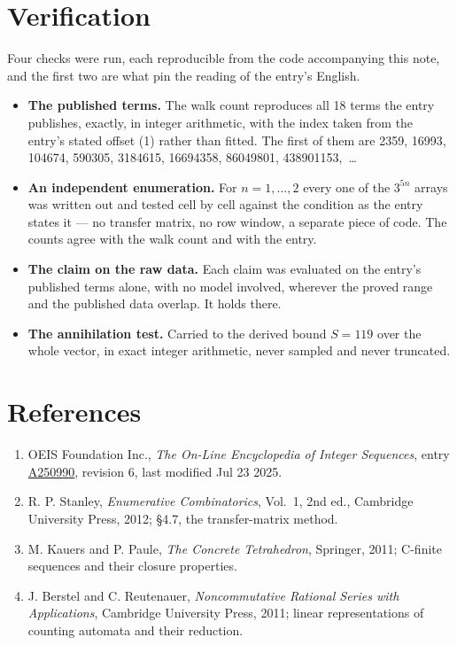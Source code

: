 \documentclass[11pt]{article}
\theoremstyle{definition}
\begin{document}
\section{Verification}

Four checks were run, each reproducible from the code accompanying this note, and the first two are what pin the reading of the entry's English.

\begin{itemize}

\item {\bfseries The published terms.} The walk count reproduces all 18 terms the entry publishes, exactly, in integer arithmetic, with the index taken from the entry's stated offset (1) rather than fitted. The first of them are 2359, 16993, 104674, 590305, 3184615, 16694358, 86049801, 438901153,~\dots

\item {\bfseries An independent enumeration.} For $n = 1,\dots,2$ every one of the $3^{5n}$ arrays was written out and tested cell by cell against the condition as the entry states it --- no transfer matrix, no row window, a separate piece of code. The counts agree with the walk count and with the entry.

\item {\bfseries The claim on the raw data.} Each claim was evaluated on the entry's published terms alone, with no model involved, wherever the proved range and the published data overlap. It holds there.

\item {\bfseries The annihilation test.} Carried to the derived bound $S = 119$ over the whole vector, in exact integer arithmetic, never sampled and never truncated.

\end{itemize}

\section{References}

\begin{enumerate}

\item OEIS Foundation Inc., \emph{The On-Line Encyclopedia of Integer Sequences}, entry \href{https://oeis.org/A250990}{A250990}, revision 6, last modified Jul 23 2025.

\item R. P. Stanley, \emph{Enumerative Combinatorics}, Vol.~1, 2nd ed., Cambridge University Press, 2012; \S4.7, the transfer-matrix method.

\item M. Kauers and P. Paule, \emph{The Concrete Tetrahedron}, Springer, 2011; C-finite sequences and their closure properties.

\item J. Berstel and C. Reutenauer, \emph{Noncommutative Rational Series with Applications}, Cambridge University Press, 2011; linear representations of counting automata and their reduction.

\end{enumerate}
\end{document}
